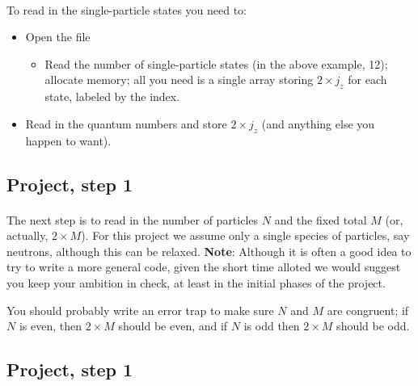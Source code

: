 \documentclass[%
twoside,                 %
final,                   %
10pt]{article}
\begin{document}
\paragraph{}
To read in the single-particle states you need to:
\begin{itemize}
\item Open the file 
\begin{itemize}

 \item Read the number of single-particle states (in the above example, 12);  allocate memory; all you need is a single array storing $2\times j_z$ for each state, labeled by the index.

\end{itemize}

\noindent
\item Read in the quantum numbers and store $2 \times j_z$ (and anything else you happen to want).
\end{itemize}

\noindent



\subsection*{Project, step 1}

\paragraph{}

The next step is to read in the number of particles $N$ and the fixed total $M$ (or, actually, $2 \times M$). 
For this project we assume only a single species of particles, say neutrons, although this can be 
relaxed. \textbf{Note}: Although it is often a good idea to try to write a more general code, given the 
short time alloted we would suggest you keep your ambition in check, at least in the initial phases of the 
project.  


You should probably write an error trap to make sure $N$ and $M$ are congruent; if $N$ is even, then 
$2 \times M$ should be even, and if $N$ is odd then $2\times M$ should be odd.



\subsection*{Project, step 1}
\end{document}
